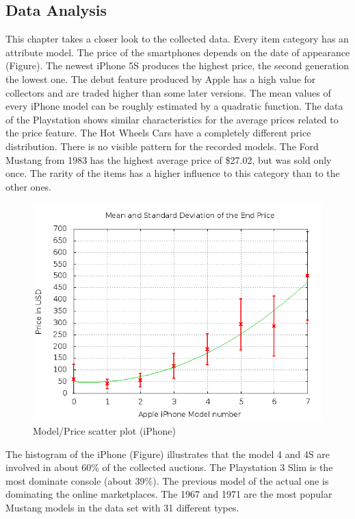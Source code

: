 \subsection{Data Analysis}
This chapter takes a closer look to the collected data. Every item category has an attribute model. The price of the smartphones depends on the date of appearance (Figure). The newest iPhone 5S produces the highest price, the second generation the lowest one. The debut feature produced by Apple has a high value for collectors and are traded higher than some later versions. The mean values of every iPhone model can be roughly estimated by a quadratic function. The data of the Playstation shows similar characteristics for the average prices related to the price feature. The Hot Wheels Cars have a completely different price distribution. There is no visible pattern for the recorded models. The Ford Mustang from 1983 has the highest average price of \$27.02, but was sold only once. The rarity of the items has a higher influence to this category than to the other ones.\\
\begin{figure}
\centering
\includegraphics[scale=0.5]{images/plots/iphone/price_model_iphone.png}
\caption{Model/Price scatter plot (iPhone)}
\label{model_price_iphone}
\end{figure}
The histogram of the iPhone (Figure) illustrates that the model 4 and 4S are involved in about 60\% of the collected auctions. The Playstation 3 Slim is the most dominate console (about 39\%). The previous model of the actual one is dominating the online marketplaces. The 1967 and 1971 are the most popular Mustang models in the data set with 31 different types.\\
